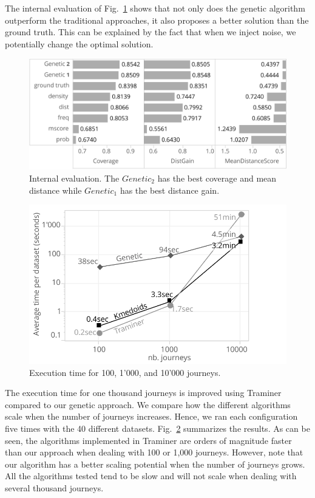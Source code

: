 \documentclass[runningheads]{llncs}
\begin{document}
{{{The internal evaluation of Fig.~\ref{fig:eval_internal} shows that not only does the genetic algorithm outperform the traditional approaches, it also proposes a better solution than the ground truth. This can be explained by the fact that when we inject noise, we potentially change the optimal solution.  



\begin{figure}[H]
\centering
\includegraphics[width=0.9\columnwidth]{05_schema/eval_internal.pdf}
  \caption{Internal evaluation. The $Genetic_2$ has the best coverage and mean distance while $Genetic_1$ has the best distance gain.}
  \label{fig:eval_internal}
\end{figure}


\begin{figure}[H]
  \begin{center}
    
	\includegraphics[width=0.42\columnwidth]{05_schema/time.pdf}
    
  \end{center}
  \caption{Execution time for 100, 1'000, and 10'000 journeys.}
  \label{fig:performance-time}
\end{figure}

The execution time for one thousand journeys is improved using Traminer \cite{gabadinho2013searching} compared to our genetic approach. We compare how the different algorithms scale when the number of journeys increases. Hence, we ran each configuration five times with the 40 different datasets. Fig.~\ref{fig:performance-time} summarizes the results. As can be seen, the algorithms implemented in Traminer are orders of magnitude faster than our approach when dealing with 100 or 1,000 journeys. However, note that our algorithm has a better scaling potential when the number of journeys grows. All the algorithms tested tend to be slow and will not scale when dealing with several thousand journeys. 

}}}
\end{document}
